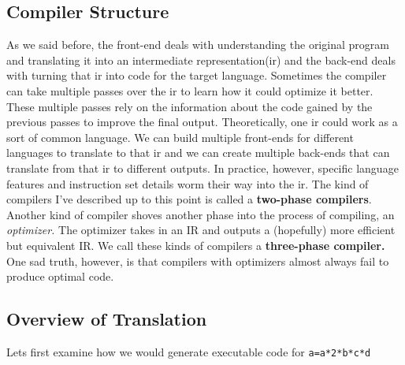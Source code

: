 \documentclass{article}
\begin{document}
\subsection{Compiler Structure}
As we said before, the front-end deals with understanding the original program and translating it into an intermediate representation(ir) and the back-end deals with turning that ir into code for the target language. Sometimes the compiler can take multiple passes over the ir to learn how it could optimize it better. These multiple passes rely on the information about the code gained by the previous passes to improve the final output. Theoretically, one ir could work as a sort of common language. We can build multiple front-ends for different languages to translate to that ir and we can create multiple back-ends that can translate from that ir to different outputs. In practice, however, specific language features and instruction set details worm their way into the ir. The kind of compilers I've described up to this point is called a \textbf{two-phase compilers}. Another kind of compiler shoves another phase into the process of compiling, an \textit{optimizer.} The optimizer takes in an IR and outputs a (hopefully) more efficient but equivalent IR. We call these kinds of compilers a \textbf{three-phase compiler.} One sad truth, however, is that compilers with optimizers almost always fail to produce optimal code.
\subsection{Overview of Translation}
Lets first examine how we would generate executable code for \texttt{a=a*2*b*c*d}
\end{document}
